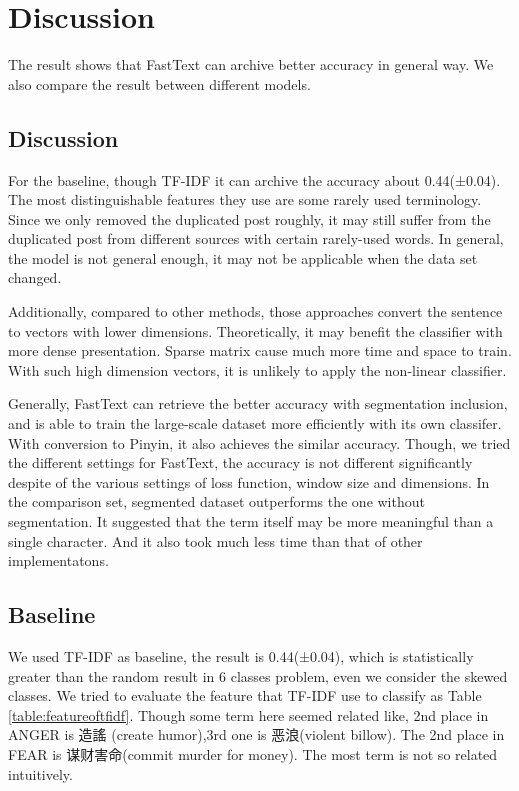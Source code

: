 \chapter{Discussion}

The result shows that FastText can archive better accuracy in general way. We also compare the result between different models.

\section{Discussion}


For the baseline, though TF-IDF it can archive the accuracy about 0.44(±0.04). 
The most distinguishable features they use are some rarely used terminology. 
Since we only removed the duplicated post roughly, it may still suffer from the duplicated post from different sources with certain rarely-used words. 
In general, the model is not general enough, it may not be applicable when the data set changed. 

Additionally, compared to other methods, those approaches convert the sentence to vectors with lower dimensions.
Theoretically, it may benefit the classifier with more dense presentation. Sparse matrix cause much more time and space to train.
With such high dimension vectors, it is unlikely to apply the non-linear classifier.

Generally, FastText can retrieve the better accuracy with segmentation inclusion, and is able to train the large-scale dataset more efficiently with its own classifer.
With conversion to Pinyin, it also achieves the similar accuracy. Though, we tried the different settings for FastText,
the accuracy is not different significantly despite of the various settings of loss function, window size and dimensions. 
In the comparison set, segmented dataset outperforms the one without segmentation. 
It suggested that the term itself may be more meaningful than a single character. And it also took much less time than that of other implementatons.

\section{Baseline}

We used TF-IDF as baseline, the result is 0.44(±0.04), which is statistically greater than the random result in 6 classes problem, 
even we consider the skewed classes.  We tried to evaluate the feature that TF-IDF use to classify as Table \ref{table:featureoftfidf}. 
Though some term here seemed related like, 2nd place in ANGER is 造謠 (create humor),3rd one is 恶浪(violent billow). 
The 2nd place in FEAR is 谋财害命(commit murder for money). The most term is not so related intuitively. 

